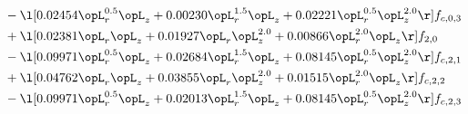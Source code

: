 \begin{alignat}{2}
& - \l[  0.02454 \opL_r^{0.5} \opL_z +  0.00230 \opL_r^{1.5} \opL_z +  0.02221 \opL_r^{0.5} \opL_z^{2.0}  \r] f_{c,0,3} \nonumber \\ 
& + \l[  0.02381 \opL_r \opL_z +  0.01927 \opL_r \opL_z^{2.0} +  0.00866 \opL_r^{2.0} \opL_z  \r] f_{2,0} \nonumber \\ 
& - \l[  0.09971 \opL_r^{0.5} \opL_z +  0.02684 \opL_r^{1.5} \opL_z +  0.08145 \opL_r^{0.5} \opL_z^{2.0}  \r] f_{c,2,1} \nonumber \\ 
& + \l[  0.04762 \opL_r \opL_z +  0.03855 \opL_r \opL_z^{2.0} +  0.01515 \opL_r^{2.0} \opL_z  \r] f_{c,2,2} \nonumber \\ 
& - \l[  0.09971 \opL_r^{0.5} \opL_z +  0.02013 \opL_r^{1.5} \opL_z +  0.08145 \opL_r^{0.5} \opL_z^{2.0}  \r] f_{c,2,3} \nonumber \\ 
\end{alignat} 


